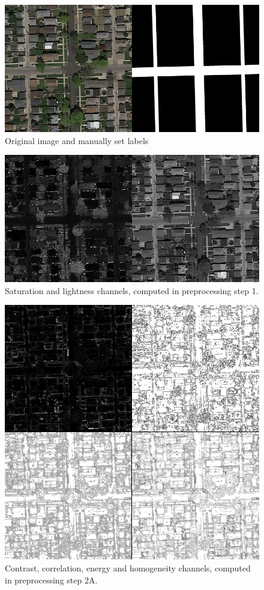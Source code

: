 \documentclass[10pt,conference,compsocconf]{IEEEtran}
\begin{document}
\begin{figure}
	\includegraphics[width=\columnwidth]{pictures/original_and_truth}
	\caption{Original image and manually set labels}
	\label{fig:original_and_truth}
\end{figure}
\begin{figure}
	\includegraphics[width=\columnwidth]{pictures/saturation_and_lightness}
	\caption{Saturation and lightness channels, computed in preprocessing step 1.}
	\label{fig:satlit}
\end{figure}
\begin{figure}
	\includegraphics[width=\columnwidth]{pictures/preproc1_all}
	\caption{Contrast, correlation, energy and homogeneity channels, computed in preprocessing step 2A.}
	\label{fig:preproc_glcm}
\end{figure}
\end{document}
